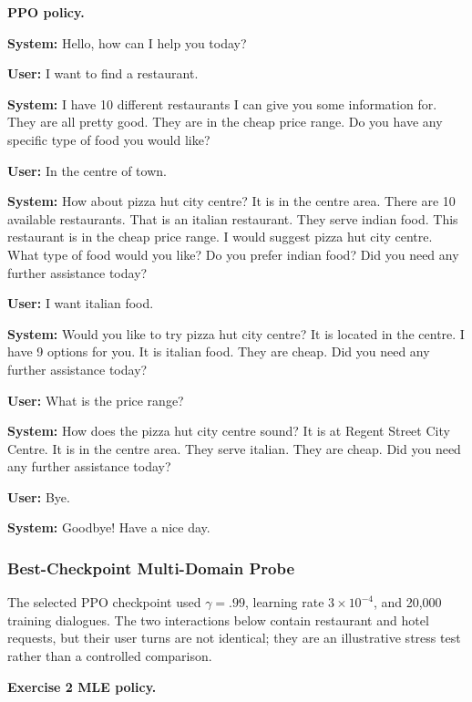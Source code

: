 \documentclass[11pt]{article}
\newcommand{\dialogueturn}[2]{\noindent\textbf{#1:} #2\par\smallskip}
\newcommand{\dialogueheading}[1]{\par\smallskip\noindent\textbf{#1}\par}
\begin{document}
\newpage
\enlargethispage{\baselineskip}
\dialogueheading{PPO policy.}

\begingroup
\small
\dialogueturn{System}{Hello, how can I help you today?}
\dialogueturn{User}{I want to find a restaurant.}
\dialogueturn{System}{I have 10 different restaurants I can give you some
information for. They are all pretty good. They are in the cheap price range.
Do you have any specific type of food you would like?}
\dialogueturn{User}{In the centre of town.}
\dialogueturn{System}{How about pizza hut city centre? It is in the centre
area. There are 10 available restaurants. That is an italian restaurant. They
serve indian food. This restaurant is in the cheap price range. I would suggest
pizza hut city centre. What type of food would you like? Do you prefer indian
food? Did you need any further assistance today?}
\dialogueturn{User}{I want italian food.}
\dialogueturn{System}{Would you like to try pizza hut city centre? It is
located in the centre. I have 9 options for you. It is italian food. They are
cheap. Did you need any further assistance today?}
\dialogueturn{User}{What is the price range?}
\dialogueturn{System}{How does the pizza hut city centre sound? It is at Regent
Street City Centre. It is in the centre area. They serve italian. They are
cheap. Did you need any further assistance today?}
\dialogueturn{User}{Bye.}
\dialogueturn{System}{Goodbye! Have a nice day.}
\endgroup

\subsubsection{Best-Checkpoint Multi-Domain Probe}
\label{app:ppo-dialogue}
The selected PPO checkpoint used $\gamma=.99$, learning rate
$3\times10^{-4}$, and 20,000 training dialogues. The two interactions below
contain restaurant and hotel requests, but their user turns are not identical;
they are an illustrative stress test rather than a controlled comparison.

\dialogueheading{Exercise 2 MLE policy.}
\end{document}
